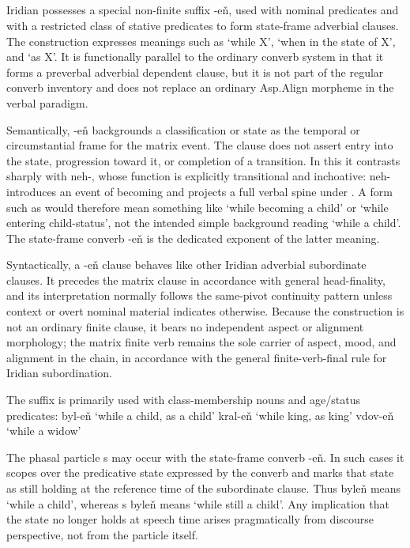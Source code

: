 \subsection{}

Iridian possesses a special non-finite suffix -eň, used with nominal predicates
and with a restricted class of stative predicates to form state-frame adverbial
clauses. The construction expresses meanings such as ‘while X’, ‘when in the
state of X’, and ‘as X’. It is functionally parallel to the ordinary converb
system in that it forms a preverbal adverbial dependent clause, but it is not
part of the regular converb inventory and does not replace an ordinary Asp.Align
morpheme in the verbal paradigm.

Semantically, -eň backgrounds a classification or state as the temporal or
circumstantial frame for the matrix event. The clause does not assert entry into
the state, progression toward it, or completion of a transition. In this it
contrasts sharply with neh-, whose function is explicitly transitional and
inchoative: neh- introduces an event of becoming and projects a full verbal
spine under . A form such as  would therefore mean something
like ‘while becoming a child’ or ‘while entering child-status’, not the intended
simple background reading ‘while a child’. The state-frame converb -eň is the
dedicated exponent of the latter meaning.

Syntactically, a -eň clause behaves like other Iridian adverbial subordinate
clauses. It precedes the matrix clause in accordance with general head-finality,
and its interpretation normally follows the same-pivot continuity pattern unless
context or overt nominal material indicates otherwise. Because the construction
is not an ordinary finite clause, it bears no independent aspect or alignment
morphology; the matrix finite verb remains the sole carrier of aspect, mood, and
alignment in the chain, in accordance with the general finite-verb-final rule
for Iridian subordination.


The suffix is primarily used with class-membership nouns and age/status predicates:
byl-eň ‘while a child, as a child’
kral-eň ‘while king, as king’
vdov-eň ‘while a widow’

The phasal particle s may occur with the state-frame converb -eň. In such cases it scopes over the predicative state expressed by the converb and marks that state as still holding at the reference time of the subordinate clause. Thus byleň means ‘while a child’, whereas s byleň means ‘while still a child’. Any implication that the state no longer holds at speech time arises pragmatically from discourse perspective, not from the particle itself.


